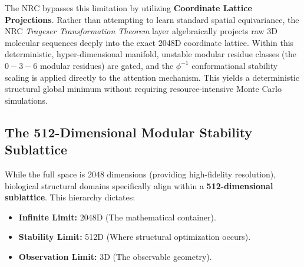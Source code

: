 The NRC bypasses this limitation by utilizing \textbf{Coordinate Lattice Projections}. Rather than attempting to learn standard spatial equivariance, the NRC \textit{Trageser Transformation Theorem} layer algebraically projects raw 3D molecular sequences deeply into the exact 2048D coordinate lattice. Within this deterministic, hyper-dimensional manifold, unstable modular residue classes (the $0-3-6$ modular residues) are gated, and the $\phi^{-1}$ conformational stability scaling is applied directly to the attention mechanism. This yields a deterministic structural global minimum without requiring resource-intensive Monte Carlo simulations.

\subsection{The 512-Dimensional Modular Stability Sublattice}
While the full space is 2048 dimensions (providing high-fidelity resolution), biological structural domains specifically align within a \textbf{512-dimensional sublattice}. This hierarchy dictates:
\begin{itemize}
	\item \textbf{Infinite Limit:} 2048D (The mathematical container).
	\item \textbf{Stability Limit:} 512D (Where structural optimization occurs).
	\item \textbf{Observation Limit:} 3D (The observable geometry).
\end{itemize}
